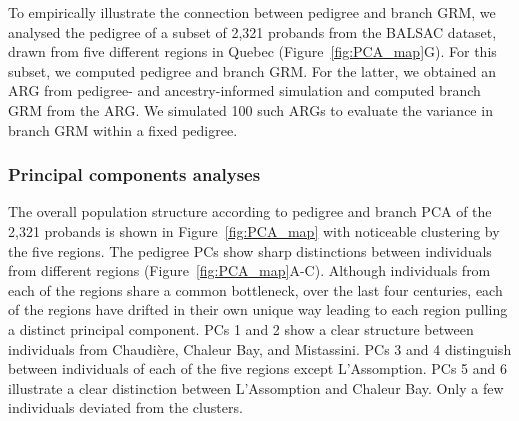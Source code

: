 To empirically illustrate the connection between pedigree and branch GRM,
we analysed the pedigree of a subset of 2,321 probands from the BALSAC dataset,
drawn from five different regions in Quebec (Figure~\ref{fig:PCA_map}G).
%
For this subset, we computed pedigree and branch GRM.
%
For the latter, we obtained an ARG from pedigree- and ancestry-informed simulation
and computed branch GRM from the ARG.
%
We simulated 100 such ARGs to evaluate the variance in branch GRM within a fixed pedigree.

\subsubsection{Principal components analyses}

The overall population structure according to pedigree and branch PCA
of the 2,321 probands is shown in Figure~\ref{fig:PCA_map}
with noticeable clustering by the five regions.
%
The pedigree PCs show sharp distinctions between individuals from different regions
(Figure~\ref{fig:PCA_map}A-C).
%
Although individuals from each of the regions share a common bottleneck,
over the last four centuries,
each of the regions have drifted in their own unique way
leading to each region pulling a distinct principal component.
%
PCs 1 and 2 show a clear structure between individuals from Chaudière, Chaleur Bay, and Mistassini.
%
PCs 3 and 4 distinguish between individuals of each of the five regions except L'Assomption.
%
PCs 5 and 6 illustrate a clear distinction between L'Assomption and Chaleur Bay.
%
Only a few individuals deviated from the clusters.

